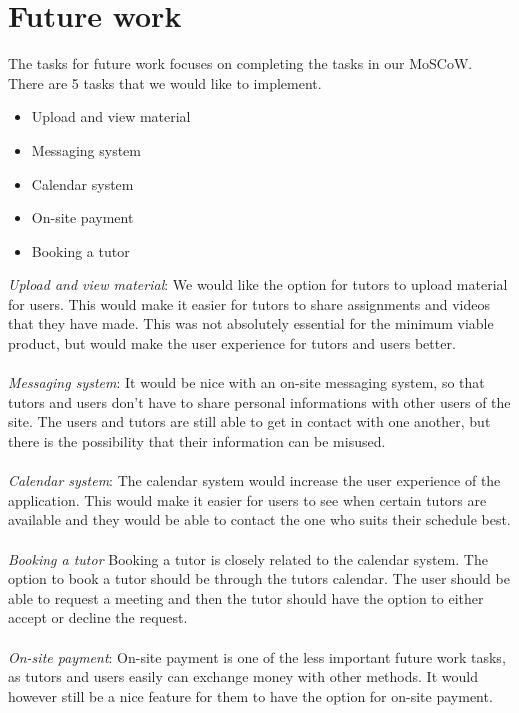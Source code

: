 \section{Future work}
The tasks for future work focuses on completing the tasks in our MoSCoW.
There are 5 tasks that we would like to implement.

\begin{itemize}
    \item Upload and view material
    \item Messaging system
    \item Calendar system
    \item On-site payment
    \item Booking a tutor
\end{itemize}
\noindent
\textit{Upload and view material}:
We would like the option for tutors to upload material for users. 
This would make it easier for tutors to share assignments and videos that they have made. 
This was not absolutely essential for the minimum viable product, but would make the user experience for tutors and users better.
\\\\
\textit{Messaging system}: 
It would be nice with an on-site messaging system, so that tutors and users don't have to share personal informations with other users of the site.
The users and tutors are still able to get in contact with one another, but there is the possibility that their information can be misused.
\\\\
\textit{Calendar system}:
The calendar system would increase the user experience of the application. 
This would make it easier for users to see when certain tutors are available and they would be able to contact the one who suits their schedule best.
\\\\
\textit{Booking a tutor}
Booking a tutor is closely related to the calendar system.
The option to book a tutor should be through the tutors calendar. 
The user should be able to request a meeting and then the tutor should have the option to either accept or decline the request.
\\\\
\textit{On-site payment}:
On-site payment is one of the less important future work tasks, as tutors and users easily can exchange money with other methods.
It would however still be a nice feature for them to have the option for on-site payment.